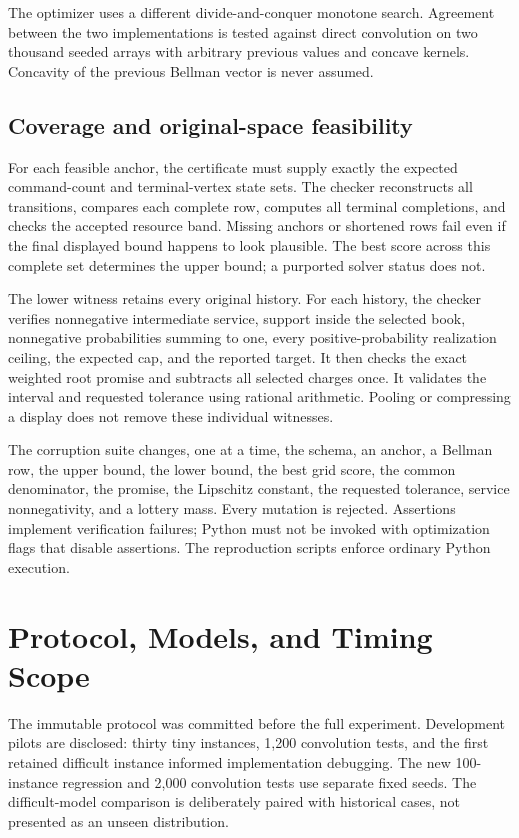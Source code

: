 The optimizer uses a different divide-and-conquer monotone search. Agreement between the two implementations is tested against direct convolution on two thousand seeded arrays with arbitrary previous values and concave kernels. Concavity of the previous Bellman vector is never assumed.

\subsection{Coverage and original-space feasibility}
For each feasible anchor, the certificate must supply exactly the expected command-count and terminal-vertex state sets. The checker reconstructs all transitions, compares each complete row, computes all terminal completions, and checks the accepted resource band. Missing anchors or shortened rows fail even if the final displayed bound happens to look plausible. The best score across this complete set determines the upper bound; a purported solver status does not.

The lower witness retains every original history. For each history, the checker verifies nonnegative intermediate service, support inside the selected book, nonnegative probabilities summing to one, every positive-probability realization ceiling, the expected cap, and the reported target. It then checks the exact weighted root promise and subtracts all selected charges once. It validates the interval and requested tolerance using rational arithmetic. Pooling or compressing a display does not remove these individual witnesses.

The corruption suite changes, one at a time, the schema, an anchor, a Bellman row, the upper bound, the lower bound, the best grid score, the common denominator, the promise, the Lipschitz constant, the requested tolerance, service nonnegativity, and a lottery mass. Every mutation is rejected. Assertions implement verification failures; Python must not be invoked with optimization flags that disable assertions. The reproduction scripts enforce ordinary Python execution.

\section{Protocol, Models, and Timing Scope}\label{sec:protocolec52}
The immutable protocol was committed before the full experiment. Development pilots are disclosed: thirty tiny instances, 1,200 convolution tests, and the first retained difficult instance informed implementation debugging. The new 100-instance regression and 2,000 convolution tests use separate fixed seeds. The difficult-model comparison is deliberately paired with historical cases, not presented as an unseen distribution.

